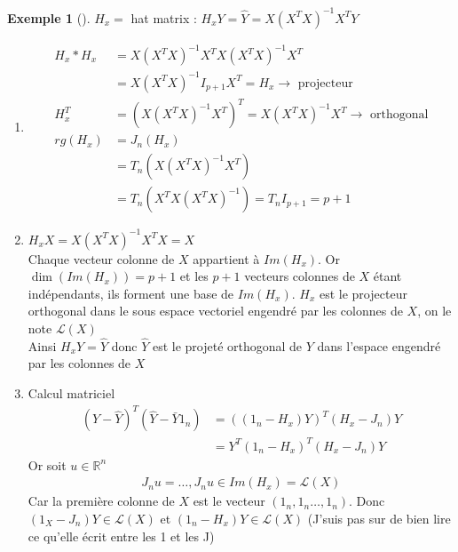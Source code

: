 \documentclass{article}
\theoremstyle{plain}%
\theoremstyle{definition}
\newtheorem{exmp}{Exemple}[section]
\theoremstyle{remark}
\begin{document}
\begin{exmp}[]
    $ H_x = $ hat matrix : $ H_x Y = \hat{Y} = X(X^TX)^{-1}X^T Y$ \begin{enumerate}
        \item \begin{align*}
            H_x * H_x &= X(X^TX)^{-1} X^T X(X^TX)^{-1} X^T \\
            &= X(X^TX)^{-1} I_{p+1} X^T = H_x \rightarrow \text{ projecteur } \\
%
            H_x^T &= (X (X^TX)^{-1} X^T)^T = X(X^TX)^{-1} X^T \rightarrow \text{ orthogonal} \\ 
%
            rg(H_x) &= J_n (H_x) \\ 
                    &= T_n ( X(X^TX)^{-1} X^T) \\
                    &= T_n (X^T X(X^TX)^{-1}) = T_n I_{p+1} = p+1
        \end{align*}
        \item $ H_x X = X (X^TX)^{-1} X^T X = X $ \\ 
        Chaque vecteur colonne de $ X $ appartient à $ Im(H_x) $. Or $ \dim (Im(H_x) ) = p+1 $ et les $ p+1 $ vecteurs colonnes de $ X $ étant indépendants, ils forment une base de $ Im(H_x) $. $ H_x $ est le projecteur orthogonal dans le sous espace vectoriel engendré par les colonnes de $ X $, on le note $ \mathcal{L}(X) $ \\ 
        Ainsi $ H_x Y = \hat{Y} $ donc $ \hat{Y} $ est le projeté orthogonal de $ Y $ dans l'espace engendré par les colonnes de $ X $ 
        \item Calcul matriciel 
        \begin{align*}
            (Y - \hat{Y})^T (\hat{Y} - \bar{Y}1_{n}) &= ( (1_{n} - H_x) Y )^T (H_x - J_n)Y \\
            &= Y^T (1_{n} - H_x)^T (H_x - J_n )Y 
        \end{align*}
        Or soit $ u \in \mathbb{R}^n $ 
        \begin{align*}
            J_n u = \dots, J_n u \in Im(H_x) = \mathcal{L}(X)
        \end{align*}
        Car la première colonne de $ X $ est le vecteur $ (1_n ,1_n \dots, 1_n) $. Donc $ (1_X - J_n)Y \in \mathcal{L}(X)$ et $ (1_n - H_x)Y \in \mathcal{L}(X) $ (J'suis pas sur de bien lire ce qu'elle écrit entre les 1 et les J)
    \end{enumerate}
\end{exmp}
\end{document}
